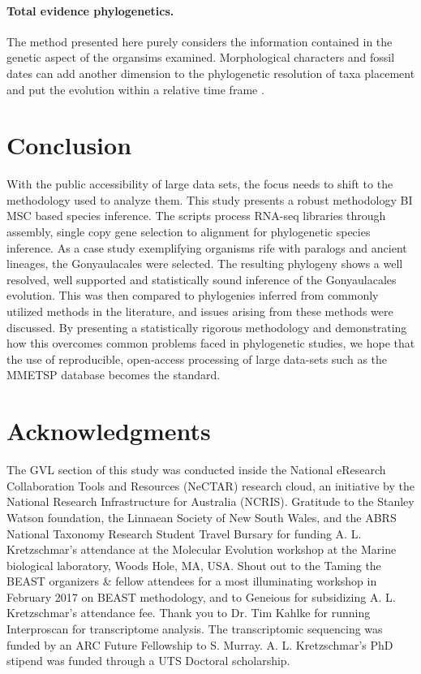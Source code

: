 \documentclass[12pt]{article}
\begin{document}
\paragraph*{Total evidence phylogenetics.}
The method presented here purely considers the information contained in the genetic aspect of the organsims examined. 
Morphological characters and fossil dates can add another dimension to the phylogenetic resolution of taxa placement and put the evolution within a relative time frame \cite{gavryushkina2017bayesian}.  

\newpage
\section{Conclusion}
With the public accessibility of large data sets, the focus needs to shift to the methodology used to analyze them. 
This study presents a robust methodology BI MSC based species inference. 
The scripts process RNA-seq libraries through assembly, single copy gene selection to alignment for phylogenetic species inference. 
As a case study exemplifying organisms rife with paralogs and ancient lineages, the Gonyaulacales were selected. 
The resulting phylogeny shows a well resolved, well supported and statistically sound inference of the Gonyaulacales evolution. 
This was then compared to phylogenies inferred from commonly utilized methods in the literature, and issues arising from these methods were discussed. 
By presenting a statistically rigorous methodology and demonstrating how this overcomes common problems faced in phylogenetic studies, we hope that the use of reproducible, open-access processing of large data-sets such as the MMETSP database becomes the standard.  
\newpage

\section{Acknowledgments}
The GVL section of this study was conducted inside the National eResearch Collaboration Tools and Resources (NeCTAR) research cloud, an initiative by the National Research Infrastructure for Australia (NCRIS).
Gratitude to the Stanley Watson foundation, the Linnaean Society of New South Wales, and the ABRS National Taxonomy Research Student Travel Bursary for funding A. L. Kretzschmar's attendance at the Molecular Evolution workshop at the Marine biological laboratory, Woods Hole, MA, USA.
Shout out to the Taming the BEAST organizers \& fellow attendees for a most illuminating workshop in February 2017 on BEAST methodology, and to Geneious for subsidizing A. L. Kretzschmar's attendance fee.
Thank you to Dr. Tim Kahlke for running Interproscan for transcriptome analysis. 
The transcriptomic sequencing was funded by  an ARC Future Fellowship to S. Murray.
A. L. Kretzschmar's PhD stipend was funded through a UTS Doctoral scholarship.
\end{document}
